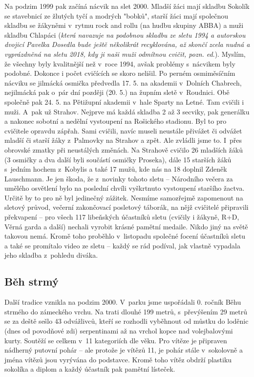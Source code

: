 \documentclass[a5paper, 11pt, twoside]{article}
\begin{document}
Na podzim 1999 pak začíná nácvik na slet 2000. Mladší žáci mají skladbu
Sokolík se stavebnicí ze žlutých tyčí a modrých "bobků", starší žáci
mají společnou skladbu se žákyněmi v~rytmu rock and rollu (na hudbu
skupiny ABBA) a muži skladbu Chlapáci (\textit{která navazuje na podobnou
skladbu ze sletu 1994 a autorskou dvojicí Pavelka Dosedla bude ještě
několikrát recyklována, až skončí zcela nudná a vyprázdněná na sletu
2018, kdy ji naši muži odmítnou cvičit, pozn. ed}.). Myslím, že všechny
byly kvalitnější než v~roce 1994, avšak problémy s~nácvikem byly
podobné. Dokonce i počet cvičících se skoro nelišil. Po perném
osmiměsíčním nácviku se jilmácká osmička předvedla 17. 5. na akademii
v~Dolních Chabrech, nejilmácká pak o~pár dní později (20. 5.) na župním
sletě v~Roudnici. Obě společně pak 24. 5. na Pětižupní akademii v~hale
Sparty na Letné. Tam cvičili i muži. A~pak už Strahov. Nejprve má každá
skladba 2 až 3 secviky, pak generálku a nakonec sobotní a nedělní
vystoupení na Rošického stadionu. Byl to pro cvičitele opravdu zápřah.
Sami cvičili, navíc museli neustále přivážet či odvážet mladší či starší
žáky z~Palmovky na Strahov a zpět. Ale zvládli jsme to. I~přes obrovské
zmatky při neustálých změnách. Na Strahově cvičilo 26 mladších žáků (3
osmičky a dva další byli součástí osmičky Proseka), dále 15 starších
žáků s~jedním hochem z~Kobylis a také 17 mužů, kde nás na 18 doplnil
Zdeněk Lauschmann. Je jen škoda, že z~novinky tohoto sletu -- Národního
večera za umělého osvětlení bylo na poslední chvíli vyškrtnuto
vystoupení staršího žactva. Určitě by to pro ně byl jedinečný zážitek.
Nesmíme samozřejmě zapomenout na sletový průvod, večerní zakončovací
posletový táborák, na nějž cvičitelé připravili překvapení -- pro všech
117 libeňských účastníků sletu (cvičily i žákyně, R+D, Věrná garda a
další) nechali vyrobit krásné pamětní medaile. Nikdo jiný na světě
takovou nemá. Kromě toho proběhlo v~listopadu společné focení účastníků
sletu a také se promítalo video ze sletu -- každý se rád podíval, jak
vlastně vypadala jeho skladba z~pohledu diváka.

\subsection{Běh strmý}

Další tradice vznikla na podzim 2000. V~parku jsme uspořádali 0. ročník
Běhu strmého do zámeckého vrchu. Na trati dlouhé 199 metrů, s~převýšením
29 metrů se za deště sešlo 43 odvážlivců, kteří se rozhodli vyběhnout od
můstku do loděnic (dnes od povodňové zdi) serpentinami až na vrchol
kopce nad volejbalovými kurty. Soutěží se celkem v~11 kategoriích dle
věku. Pro vítěze je připraven nádherný putovní pohár -- ale protože je
vítězů 11, je pohár stále v~sokolovně a jména vítězů jsou vyrývána do
podstavce. Kromě toho vítěz obdrží plastiku sokolíka a diplom a každý
účastník pak pamětní lísteček.
\end{document}
